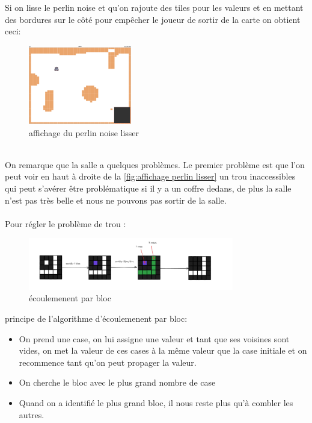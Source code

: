 \documentclass[a4paper,11pt]{article}
\begin{document}
Si on lisse le perlin noise et qu'on rajoute des tiles pour les valeurs et en mettant des bordures sur le côté pour empêcher le joueur de sortir de la carte on obtient ceci:\\
\begin{figure}[h]
\centering
\includegraphics[width=0.4\textwidth]{./img/perlinLisser.png}
\caption{affichage du perlin noise lisser}
\label{fig:affichage perlin lisser}
\end{figure}
\\
 On remarque que la salle a quelques problèmes. Le premier problème est que l'on peut voir en haut à droite de la \autoref{fig:affichage perlin lisser} un trou inaccessibles qui peut s'avérer être problématique si il y a un coffre dedans, de plus la salle n'est pas très belle et nous ne pouvons pas sortir de la salle.
\\\\

 Pour régler le problème de trou : 
 \begin{figure}[h]
    \centering
    \includegraphics[width=0.8\textwidth]{./img/ecoulementBloc.png}
    \caption{écoulemenent par bloc}
    \label{fig:exemple ecoulement}
\end{figure}

principe de l'algorithme d'écoulemenent par bloc: 
\begin{itemize}
    \item On prend une case, on lui assigne une valeur et tant que ses voisines sont vides, on met la valeur de ces cases à la même valeur que la case initiale et on recommence tant qu'on peut propager la valeur.
    \item On cherche le bloc avec le plus grand nombre de case
    \item Quand on a identifié le plus grand bloc, il nous reste plus qu'à combler les autres.
\end{itemize}
\bigskip
\end{document}
